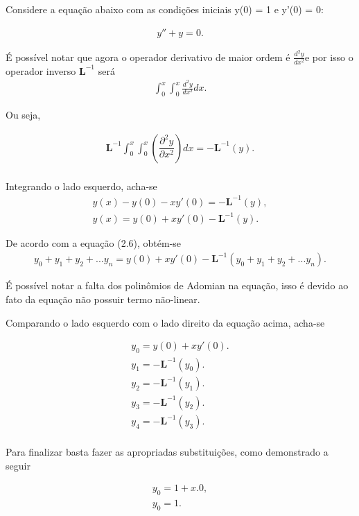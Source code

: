 Considere a equação abaixo com as condições iniciais y(0) = 1 e y'(0) = 0:

\begin{gather*}
  y'' + y = 0.
\end{gather*}

É possível notar que agora o operador derivativo de maior ordem é $\frac{d^2y }{d x^2}$e por isso o operador inverso $\textbf{L}^{-1}$ será
\begin{gather*}
 \int_0^x \int_0^x  \frac{d^2y }{d x^2}dx.
\end{gather*}

Ou seja,

\begin{gather*}
 \textbf{L}^{-1}\int_0^x \int_0^x  \left(\dfrac{\partial^2y }{\partial x^2}\right)dx = -\textbf{L}^{-1}(y).\\
\end{gather*}

Integrando o lado esquerdo, acha-se
\begin{gather*}
y(x) - y(0) - xy'(0) = - \textbf{L}^{-1}(y),\\
y(x) = y(0) + xy'(0) - \textbf{L}^{-1}(y).
\end{gather*}

De acordo com a equação (2.6), obtém-se 
\begin{gather*}
y_{0} + y_{1} + y_{2} + ...y_{n} = y(0) + xy'(0) - \textbf{L}^{-1}(y_{0} + y_{1} + y_{2}+...y_{n}).
\end{gather*}

É possível notar a falta dos polinômios de Adomian na equação, isso é devido ao fato da equação não possuir termo não-linear. 

Comparando o lado esquerdo com o lado direito da equação acima, acha-se

\begin{gather*}
y_{0} = y(0) + xy'(0) .\\
y_{1} = -\textbf{L}^{-1}(y_{0}).\\
y_{2} = -\textbf{L}^{-1}(y_{1}).\\
y_{3} = -\textbf{L}^{-1}(y_{2}).\\
y_{4} = -\textbf{L}^{-1}(y_{3}).\\
\end{gather*}

Para finalizar basta fazer as apropriadas substituições, como demonstrado a seguir

\begin{gather*}
y_{0} = 1 + x.0,\\
y_{0} = 1.\\
\end{gather*}

